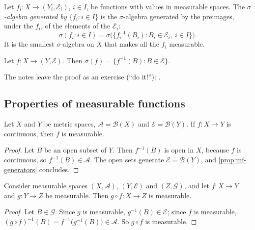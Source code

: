 \begin{definition}\label{def:mf-generated}
Let $f_i:X\to(Y_i,\mathcal E_i)$, $i\in I$, be functions with values in measurable spaces. The
\emph{$\sigma$-algebra generated by $\{f_i:i\in I\}$} is the $\sigma$-algebra generated by
the preimages, under the $f_i$, of the elements of the $\mathcal E_i$:
\[
  \sigma(f_i:i\in I)=\sigma\big(\{f_i^{-1}(B_i):B_i\in\mathcal E_i,\ i\in I\}\big).
\]
It is the smallest $\sigma$-algebra on $X$ that makes all the $f_i$ measurable.
\end{definition}

\begin{proposition}\label{prop:mf-sigma-f}
Let $f:X\to(Y,\mathcal E)$. Then $\sigma(f)=\{f^{-1}(B):B\in\mathcal E\}$.
\end{proposition}

The notes leave the proof as an exercise (``do it!''): .

\subsection{Properties of measurable functions}\label{sec:mf-properties}

\begin{proposition}\label{prop:mf-continuous}
Let $X$ and $Y$ be metric spaces, $\mathcal A=\mathcal B(X)$ and $\mathcal E=\mathcal B(Y)$. If
$f:X\to Y$ is continuous, then $f$ is measurable.
\end{proposition}

\begin{proof}
Let $B$ be an open subset of $Y$. Then $f^{-1}(B)$ is open in $X$, because $f$ is continuous,
so $f^{-1}(B)\in\mathcal A$. The open sets generate $\mathcal E=\mathcal B(Y)$, and
\cref{prop:mf-generators} concludes.
\end{proof}

\begin{proposition}[Composition]\label{prop:mf-composition}
Consider measurable spaces $(X,\mathcal A)$, $(Y,\mathcal E)$ and $(Z,\mathcal G)$, and let
$f:X\to Y$ and $g:Y\to Z$ be measurable. Then $g\circ f:X\to Z$ is measurable.
\end{proposition}

\begin{proof}
Let $B\in\mathcal G$. Since $g$ is measurable, $g^{-1}(B)\in\mathcal E$; since $f$ is
measurable, $(g\circ f)^{-1}(B)=f^{-1}\big(g^{-1}(B)\big)\in\mathcal A$. So $g\circ f$ is
measurable.
\end{proof}

